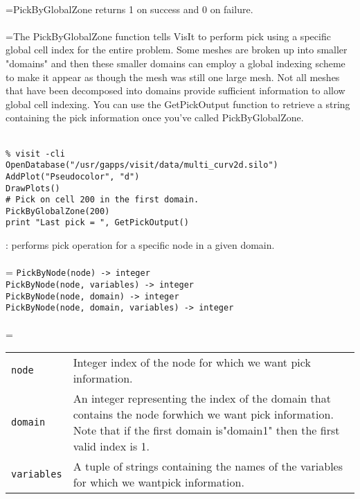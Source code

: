 \documentclass[10pt,a4paper]{report}
\begin{document}
 \\ 
\hangindent=\parindent PickByGlobalZone returns 1 on success and 0 on failure. \\[-3mm] 

 \\ 
\hangindent=\parindent The PickByGlobalZone function tells VisIt to perform pick using a specific global cell index for the entire problem. Some meshes are broken up into smaller "domains" and then these smaller domains can employ a global indexing scheme to make it appear as though the mesh was still one large mesh. Not all meshes that have been decomposed into domains provide sufficient information to allow global cell indexing. You can use the GetPickOutput function to retrieve a string containing the pick information once you've called PickByGlobalZone. \\[-3mm] 

\\[-6mm]
\begin{verbatim}% visit -cli
OpenDatabase("/usr/gapps/visit/data/multi_curv2d.silo")
AddPlot("Pseudocolor", "d")
DrawPlots()
# Pick on cell 200 in the first domain.
PickByGlobalZone(200)
print "Last pick = ", GetPickOutput()
\end{verbatim}
\newpage


{}
: performs pick operation for a specific node in a given domain.\\[-3mm]

 \\ 
\hangindent=\parindent 
\verb!PickByNode(node) -> integer!\\ 
\verb!PickByNode(node, variables) -> integer!\\ 
\verb!PickByNode(node, domain) -> integer!\\ 
\verb!PickByNode(node, domain, variables) -> integer!\\ [-3mm]

 \\ 
\hangindent=\parindent 
\begin{tabular}{lp{9cm}}
\verb!node! & Integer index of the node for which we want pick information. \\
\verb!domain! & An integer representing the index of the domain that contains the node forwhich we want pick information. Note that if the first domain is"domain1" then the first valid index is 1. \\
\verb!variables! & A tuple of strings containing the names of the variables for which we wantpick information. \\
\end{tabular} \\[-2mm]
\end{document}

